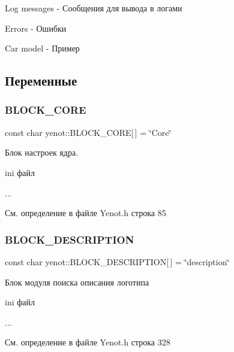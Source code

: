 Log messages -\/ Сообщения для вывода в логами

Errors -\/ Ошибки

Car model -\/ Пример 

\subsection{Переменные}
\mbox{\label{namespaceyenot_a2172a9f506029215b790a51a4023e1ac}} 
\subsubsection{\texorpdfstring{B\+L\+O\+C\+K\+\_\+\+C\+O\+RE}{BLOCK\_CORE}}
{\footnotesize\ttfamily const char yenot\+::\+B\+L\+O\+C\+K\+\_\+\+C\+O\+RE\mbox{[}$\,$\mbox{]} = \char`\"{}Core\char`\"{}}

Блок настроек ядра.

ini файл 
\begin{DoxyCode}
[Core]
...
\end{DoxyCode}
 

См. определение в файле Yenot.\+h строка 85

\mbox{\label{namespaceyenot_abc55bd8e208d61e4d5055b305d998624}} 
\subsubsection{\texorpdfstring{B\+L\+O\+C\+K\+\_\+\+D\+E\+S\+C\+R\+I\+P\+T\+I\+ON}{BLOCK\_DESCRIPTION}}
{\footnotesize\ttfamily const char yenot\+::\+B\+L\+O\+C\+K\+\_\+\+D\+E\+S\+C\+R\+I\+P\+T\+I\+ON\mbox{[}$\,$\mbox{]} = \char`\"{}description\char`\"{}}

Блок модуля поиска описания логотипа

ini файл 
\begin{DoxyCode}
...
\end{DoxyCode}
 

См. определение в файле Yenot.\+h строка 328


